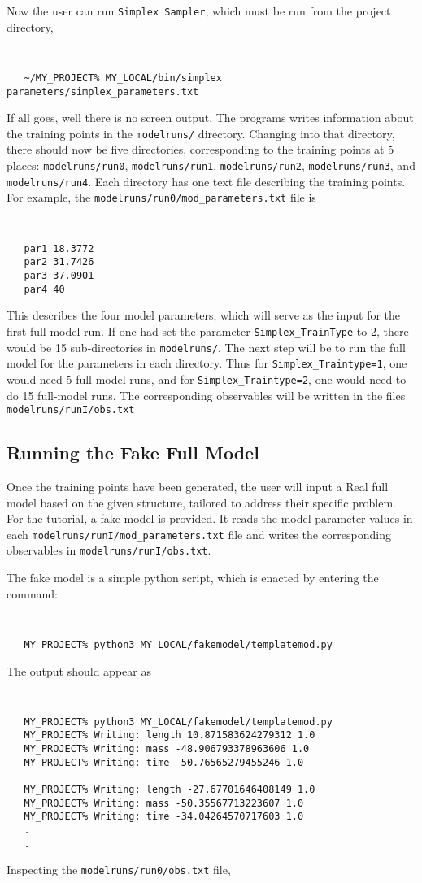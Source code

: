 \documentclass[UserManual.tex]{subfiles}
\begin{document}
Now the user can run {\tt Simplex Sampler}, which must be run from the project directory,
 {\tt
\begin{verbatim}
   ~/MY_PROJECT% MY_LOCAL/bin/simplex parameters/simplex_parameters.txt
\end{verbatim}
}
If all goes, well there is no screen output. The programs writes information about the training points in the {\tt modelruns/} directory. Changing into that directory, there should now be five directories, corresponding to the training points at 5 places: {\tt modelruns/run0}, {\tt modelruns/run1}, {\tt modelruns/run2}, {\tt modelruns/run3}, and {\tt modelruns/run4}. Each directory has one text file describing the training points. For example, the {\tt modelruns/run0/mod\_parameters.txt} file is 
{\tt
\begin{verbatim}
   par1 18.3772
   par2 31.7426
   par3 37.0901
   par4 40
\end{verbatim}
}
This describes the four model parameters, which will serve as the input for the first full model run. If one had set the parameter {\tt Simplex\_TrainType} to 2, there would be 15 sub-directories in {\tt modelruns/}. The next step will be to run the full model for the parameters in each directory. Thus for {\tt Simplex\_Traintype=1}, one would need 5 full-model runs, and for {\tt Simplex\_Traintype=2}, one would need to do 15 full-model runs. The corresponding observables will be written in the files {\tt modelruns/runI/obs.txt}

\subsection{Running the Fake Full Model}
Once the training points have been generated, the user will input a Real full model based on the given structure, tailored to address their specific problem. For the tutorial, a fake model is provided. It reads the model-parameter values in each {\tt modelruns/runI/mod\_parameters.txt} file and writes the corresponding observables in {\tt modelruns/runI/obs.txt}. 

The fake model is a simple python script, which is enacted by entering the command:

{\tt
\begin{verbatim}
   MY_PROJECT% python3 MY_LOCAL/fakemodel/templatemod.py
\end{verbatim}
}
The output should appear as

{\tt
\begin{verbatim}
   MY_PROJECT% python3 MY_LOCAL/fakemodel/templatemod.py
   MY_PROJECT% Writing: length 10.871583624279312 1.0
   MY_PROJECT% Writing: mass -48.906793378963606 1.0
   MY_PROJECT% Writing: time -50.76565279455246 1.0

   MY_PROJECT% Writing: length -27.67701646408149 1.0
   MY_PROJECT% Writing: mass -50.35567713223607 1.0
   MY_PROJECT% Writing: time -34.04264570717603 1.0
   .
   .
\end{verbatim}
}
Inspecting the {\tt modelruns/run0/obs.txt} file,
\end{document}
